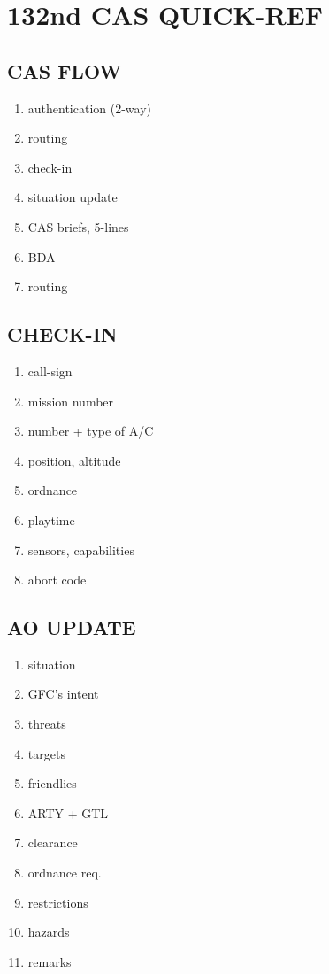 \documentclass[
  7pt,
  headinclude=false,
  footinclude=false,
  portrait,
  paper=15cm:10cm,
  twocolumn,
]{scrartcl}
\begin{document}
\raggedbottom
\section*{132nd CAS QUICK-REF}

\subsection*{CAS FLOW}
\begin{enumerate}
  \item authentication (2-way)
  \item routing 
  \item check-in
  \item situation update
  \item CAS briefs, 5-lines
  \item BDA
  \item routing 
\end{enumerate}

\subsection*{CHECK-IN}
\begin{enumerate}
  \item call-sign
  \item mission number
  \item number + type of A/C
  \item position, altitude
  \item ordnance
  \item playtime
  \item sensors, capabilities
  \item abort code
\end{enumerate}

\subsection*{AO UPDATE}
\begin{enumerate}
  \item situation
  \item GFC's intent
  \item threats
  \item targets\vspace*{0.8ex}
  \item friendlies
  \item ARTY + GTL
  \item clearance
  \item ordnance req.\vspace*{0.8ex}
  \item restrictions
  \item hazards
  \item remarks
\end{enumerate}
\end{document}
